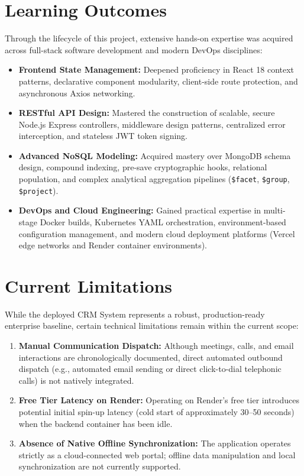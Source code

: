 \section{Learning Outcomes}
Through the lifecycle of this project, extensive hands-on expertise was acquired across full-stack software development and modern DevOps disciplines:
\begin{itemize}
    \item \textbf{Frontend State Management:} Deepened proficiency in React 18 context patterns, declarative component modularity, client-side route protection, and asynchronous Axios networking.
    \item \textbf{RESTful API Design:} Mastered the construction of scalable, secure Node.js Express controllers, middleware design patterns, centralized error interception, and stateless JWT token signing.
    \item \textbf{Advanced NoSQL Modeling:} Acquired mastery over MongoDB schema design, compound indexing, pre-save cryptographic hooks, relational population, and complex analytical aggregation pipelines (\texttt{\$facet}, \texttt{\$group}, \texttt{\$project}).
    \item \textbf{DevOps and Cloud Engineering:} Gained practical expertise in multi-stage Docker builds, Kubernetes YAML orchestration, environment-based configuration management, and modern cloud deployment platforms (Vercel edge networks and Render container environments).
\end{itemize}

\section{Current Limitations}
While the deployed CRM System represents a robust, production-ready enterprise baseline, certain technical limitations remain within the current scope:
\begin{enumerate}
    \item \textbf{Manual Communication Dispatch:} Although meetings, calls, and email interactions are chronologically documented, direct automated outbound dispatch (e.g., automated email sending or direct click-to-dial telephonic calls) is not natively integrated.
    \item \textbf{Free Tier Latency on Render:} Operating on Render's free tier introduces potential initial spin-up latency (cold start of approximately 30--50 seconds) when the backend container has been idle.
    \item \textbf{Absence of Native Offline Synchronization:} The application operates strictly as a cloud-connected web portal; offline data manipulation and local synchronization are not currently supported.
\end{enumerate}

